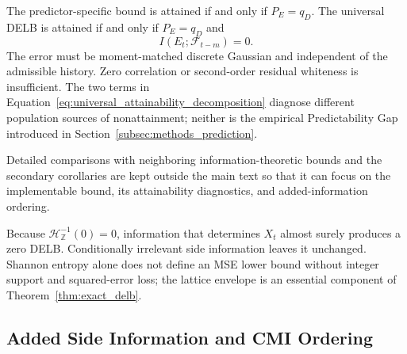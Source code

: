 \documentclass[applsci,article,accept,moreauthors]{Definitions/mdpi}
\begin{document}
The predictor-specific bound is attained if and only if \(P_E=q_D\).
The universal DELB is attained if and only if \(P_E=q_D\) and
\begin{equation}
I(E_t;\mathcal F_{t-m})=0.
\label{eq:general_innovation_independence}
\end{equation}
The error must be moment-matched discrete Gaussian and independent of the
admissible history. Zero correlation or second-order residual
whiteness is insufficient. The two terms in
Equation~\eqref{eq:universal_attainability_decomposition} diagnose different
population sources of nonattainment; neither is the empirical
Predictability Gap introduced in Section~\ref{subsec:methods_prediction}.

Detailed comparisons with neighboring information-theoretic bounds and the
secondary corollaries are kept outside the main text so that it can focus on
the implementable bound, its attainability diagnostics, and added-information
ordering.

\begin{Remark}
\label{rem:general_boundary_cases}
Because \(\mathcal H_{\mathbb Z}^{-1}(0)=0\), information that determines
\(X_t\) almost surely produces a zero DELB. Conditionally irrelevant side
information leaves it unchanged. Shannon entropy alone does not define an
MSE lower bound without integer support and squared-error loss; the lattice
envelope is an essential component of Theorem~\ref{thm:exact_delb}.
\label{rem:support_and_loss}
\end{Remark}

\subsection{Added Side Information and CMI Ordering}
\label{subsec:side_information}
\end{document}
